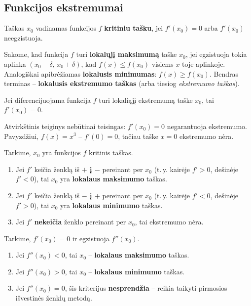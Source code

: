\subsection{Funkcijos ekstremumai}

\begin{definition}
Taškas $x_0$ vadinamas funkcijos $f$ \textbf{kritiniu tašku}, jei
$f'(x_0) = 0$ arba $f'(x_0)$ neegzistuoja.
\end{definition}

\begin{definition}
Sakome, kad funkcija $f$ turi \textbf{lokalųjį maksimumą} taške $x_0$,
jei egzistuoja tokia aplinka $(x_0-\delta,\, x_0+\delta)$, kad
$f(x) \leq f(x_0)$ visiems $x$ toje aplinkoje.
Analogiškai apibrėžiamas \textbf{lokalusis minimumas}: $f(x) \geq f(x_0)$.
Bendras terminas -- \textbf{lokalusis ekstremumo taškas} (arba tiesiog
\emph{ekstremumo taškas}).
\end{definition}

\begin{theorem}
Jei diferencijuojama funkcija $f$ turi lokaliąjį ekstremumą taške $x_0$,
tai $f'(x_0) = 0$.
\end{theorem}

\begin{remark}
Atvirkštinis teiginys nebūtinai teisingas: $f'(x_0)=0$ negarantuoja
ekstremumo. Pavyzdžiui, $f(x)=x^3$ -- $f'(0)=0$, tačiau taške $x=0$
ekstremumo nėra.
\end{remark}

\begin{theorem}
Tarkime, $x_0$ yra funkcijos $f$ kritinis taškas.
\begin{enumerate}
  \item Jei $f'$ keičia ženklą iš \textbf{$+$ į $-$} pereinant per $x_0$
        (t.\,y. kairėje $f'>0$, dešinėje $f'<0$), tai $x_0$ yra
        \textbf{lokalaus maksimumo} taškas.
  \item Jei $f'$ keičia ženklą iš \textbf{$-$ į $+$} pereinant per $x_0$
        (t.\,y. kairėje $f'<0$, dešinėje $f'>0$), tai $x_0$ yra
        \textbf{lokalaus minimumo} taškas.
  \item Jei $f'$ \textbf{nekeičia} ženklo pereinant per $x_0$, tai
        ekstremumo nėra.
\end{enumerate}
\end{theorem}

\begin{theorem}
Tarkime, $f'(x_0)=0$ ir egzistuoja $f''(x_0)$.
\begin{enumerate}
  \item Jei $f''(x_0) < 0$, tai $x_0$ -- \textbf{lokalaus maksimumo}
        taškas.
  \item Jei $f''(x_0) > 0$, tai $x_0$ -- \textbf{lokalaus minimumo}
        taškas.
  \item Jei $f''(x_0) = 0$, šis kriterijus \textbf{nesprendžia} --
        reikia taikyti pirmosios išvestinės ženklų metodą.
\end{enumerate}
\end{theorem}

